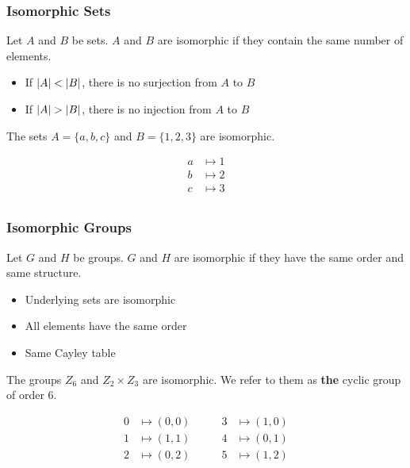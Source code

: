 \documentclass{beamer}
\DeclarePairedDelimiter{\abs}{\lvert}{\rvert}
\begin{document}
\begin{frame}
  \frametitle{Isomorphic Sets}

  \begin{lemma}
    Let \(A\) and \(B\) be sets. \(A\) and \(B\) are isomorphic if they contain
    the same number of elements.
  \end{lemma}

  \begin{itemize}
    \item If \(\abs{A} < \abs{B}\), there is no surjection from \(A\) to \(B\)
    \item If \(\abs{A} > \abs{B}\), there is no injection from \(A\) to \(B\)
  \end{itemize} \pause

  \begin{examples}
    The sets \(A = \{a, b, c\}\) and \(B = \{1, 2, 3\}\) are isomorphic.

    \begin{align*}
      a & \mapsto 1 \\
      b & \mapsto 2 \\
      c & \mapsto 3 \\
    \end{align*}
  \end{examples}
\end{frame}

\begin{frame}
  \frametitle{Isomorphic Groups}

  \begin{lemma}
    Let \(G\) and \(H\) be groups. \(G\) and \(H\) are isomorphic if they have
    the same order and same structure.
  \end{lemma}

  \begin{itemize}
    \item Underlying sets are isomorphic
    \item All elements have the same order
    \item Same Cayley table
  \end{itemize} \pause

  \begin{examples}
    The groups \(Z_6\) and \(Z_2 \times Z_3\) are isomorphic. We refer to them
    as \textbf{the} cyclic group of order 6.

    \begin{equation*}
      \begin{aligned}
        0 & \mapsto (0, 0) \\
        1 & \mapsto (1, 1) \\
        2 & \mapsto (0, 2) \\
      \end{aligned}
      \qquad
      \begin{aligned}
        3 & \mapsto (1, 0) \\
        4 & \mapsto (0, 1) \\
        5 & \mapsto (1, 2) \\
      \end{aligned}
    \end{equation*}
  \end{examples}
\end{frame}
\end{document}
